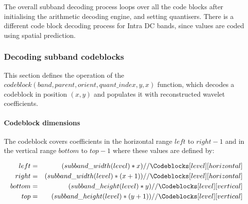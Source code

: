 The overall subband decoding process loops over all the code blocks after initialising the
arithmetic decoding engine, and setting quantisers. There is a different code block decoding
process for Intra DC bands, since values are coded using spatial prediction.

\begin{pseudo*}
\bsELSE
\bsEND
{}
    \bsEND
\bsEND

\bsEND
{}
\end{pseudo*}


\subsubsection{Decoding subband codeblocks}

\label{codeblocks}

This section defines the operation of the 
$codeblock(band,parent,orient,quant\_index,y,x)$ function, which decodes a 
codeblock in position $(x,y)$ and populates it with reconstructed 
wavelet coefficients.

\begin{comment}
[Include a figure here]
\end{comment}

\paragraph{Codeblock dimensions\newline}

The codeblock covers coefficients in the horizontal range $left$ to $right-1$ and in the vertical
range $bottom$ to $top-1$ where these values are defined by:

\begin{eqnarray*}
  left & = & (subband\_width(level)*x)//\Codeblocks[level][horizontal] \\
  right & = & (subband\_width(level)*(x+1))//\Codeblocks[level][horizontal] \\
  bottom & = & (subband\_height(level)*y)//\Codeblocks[level][vertical] \\
  top & = & (subband\_height(level)*(y+1))//\Codeblocks[level][vertical]
\end{eqnarray*}

